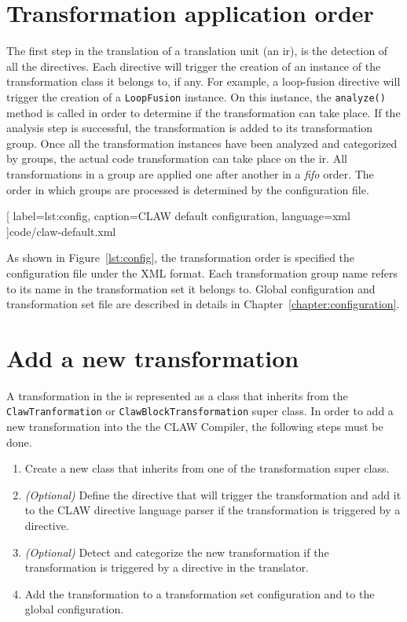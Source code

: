 \section{Transformation application order}
The first step in the translation of a translation unit (an \xcodeml \gls{ir}),
is the detection of all the directives. Each directive will trigger the
creation of an instance of the transformation class it belongs to, if any.
For example, a loop-fusion directive will trigger the creation of a
\lstinline|LoopFusion| instance. On this instance, the \lstinline|analyze()|
method is called in order to determine if the transformation can take place.
If the analysis step is successful, the transformation is added to its
transformation group. Once all the transformation instances have been analyzed
and categorized by groups, the actual code transformation can take place on
the \xcodeml \gls{ir}. All transformations in a group are applied one after
another in a \textit{fifo} order. The order in which groups are processed is
determined by the configuration file.


  [
    label=lst:config,
    caption=CLAW default configuration,
    language=xml
  ]{code/claw-default.xml}

As shown in Figure~\ref{lst:config}, the transformation order is specified the
configuration file under the XML format.
Each transformation group name refers to its name in the transformation set it
belongs to. Global configuration and transformation set file are described in
details in Chapter~\ref{chapter:configuration}.

\section{Add a new transformation}
\label{section:new_trans}
A transformation in the \clawfc is represented as a class that inherits from
the \lstinline|ClawTranformation| or \lstinline|ClawBlockTransformation|
super class. In order to add a new transformation into the the CLAW Compiler,
the following steps must be done.

\begin{enumerate}
\item Create a new class that inherits from one of the transformation
      super class.
\item \textit{(Optional)} Define the directive that will trigger the
      transformation and add it to the CLAW directive language parser if the
      transformation is triggered by a directive.
\item \textit{(Optional)} Detect and categorize the new transformation if the
      transformation is triggered by a directive in the translator.
\item Add the transformation to a transformation set configuration and to
      the global configuration.
\end{enumerate}

